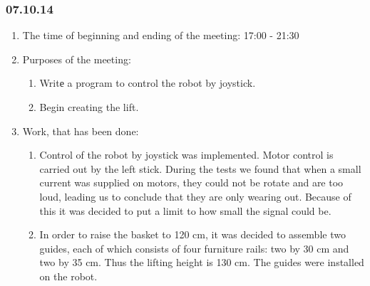 
\subsubsection{07.10.14}

\begin{enumerate}
	\item The time of beginning and ending of the meeting:
	17:00 - 21:30
	\item Purposes of the meeting:
	\begin{enumerate}
		\item Writе a program to control the robot by joystick.
		
		\item Begin creating the lift.
		
	\end{enumerate}
	\item Work, that has been done:
	\begin{enumerate}
		\item Control of the robot by joystick was implemented. Motor control is carried out by the left stick. During the tests we found that when a small current was supplied on motors, they could not be rotate and are too loud, leading us to conclude that they are only wearing out. Because of this it was decided to put a limit to how small the signal could be.
		
		\item  In order to raise the basket to 120 cm, it was decided to assemble two guides, each of which consists of four furniture rails: two by 30 cm and two by 35 cm. Thus the lifting height is 130 cm. The guides were installed on the robot.
		

\end{enumerate}
\end{enumerate}
